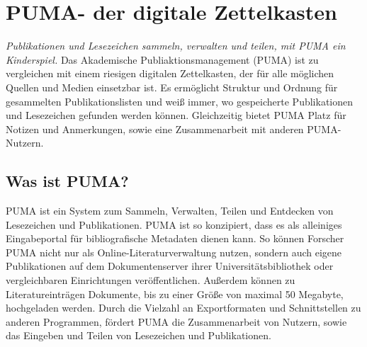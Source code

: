 \section{PUMA- der digitale Zettelkasten}
\textit{Publikationen und Lesezeichen sammeln, verwalten und teilen, mit PUMA ein Kinderspiel.}\newline
\newline
Das Akademische Publiaktionsmanagement (PUMA) ist zu vergleichen mit einem riesigen digitalen Zettelkasten, der für alle möglichen Quellen und Medien einsetzbar ist. Es ermöglicht Struktur und Ordnung für gesammelten Publikationslisten und weiß immer, wo gespeicherte Publikationen und Lesezeichen gefunden werden können. Gleichzeitig bietet PUMA Platz für Notizen und Anmerkungen, sowie eine Zusammenarbeit mit anderen PUMA-Nutzern. 
\subsection{Was ist PUMA?}
PUMA ist ein System zum Sammeln, Verwalten, Teilen und Entdecken von Lesezeichen und Publikationen. \newline
\newline
PUMA ist so konzipiert, dass es als alleiniges Eingabeportal für bibliografische Metadaten dienen kann. So können Forscher PUMA nicht nur als Online-Literaturverwaltung nutzen, sondern auch eigene Publikationen auf dem Dokumentenserver ihrer Universitätsbibliothek oder vergleichbaren Einrichtungen veröffentlichen. Außerdem können zu Literatureinträgen Dokumente, bis zu einer Größe von maximal 50 Megabyte, hochgeladen werden. \newline
Durch die Vielzahl an Exportformaten und Schnittstellen zu anderen Programmen, fördert PUMA  die Zusammenarbeit von Nutzern, sowie das Eingeben und Teilen von Lesezeichen und Publikationen. 
